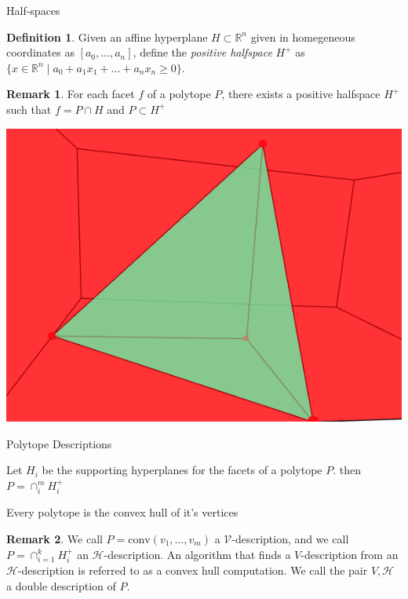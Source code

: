 \documentclass[9pt]{beamer}
\theoremstyle{definition}
\newtheorem{remark}{Remark}
\newtheorem{defn}{Definition}
\begin{document}
\begin{frame}[fragile]{Half-spaces}
  \begin{defn}
    Given an affine hyperplane $H \subset \mathbb{R}^n$ given in homegeneous
    coordinates as $[a_0, \dots, a_n]$, define the \emph{positive halfspace}
    $H^+$ as $\{x \in \mathbb{R}^n \mid a_0 + a_1x_1 + \dots + a_nx_n \geq 0 \}$.
  \end{defn}

  \begin{remark}
    For each facet $f$ of a polytope $P$, there exists a positive halfspace $H^+$
    such that $f = P \cap H$ and $ P \subset H^+$
  \end{remark}

  \begin{center}
    \includegraphics[width=.30\textwidth, height=0.4\textheight]{images/half-space}
  \end{center}
\end{frame}

\begin{frame}[fragile]{Polytope Descriptions}
  \begin{theorem}
    Let $H_i$ be the supporting hyperplanes for the facets of a polytope $P$.
    then $P = \cap_i^m H_i^+$
  \end{theorem}
  \begin{theorem}
    Every polytope is the convex hull of it's vertices
  \end{theorem}
  \begin{remark}
    We call $P =  \text{conv}(v_1, \dots, v_m)$ a $\mathcal{V}$-description, and
    we call $P =  \cap_{i=1}^kH_i^+$ an $\mathcal{H}$-description. An algorithm
    that finds a $V$-description from an $\mathcal{H}$-description is referred to as a convex
    hull computation. We call the pair ${V, \mathcal{H} }$ a double description of $P$.
  \end{remark}
\end{frame}
\end{document}
